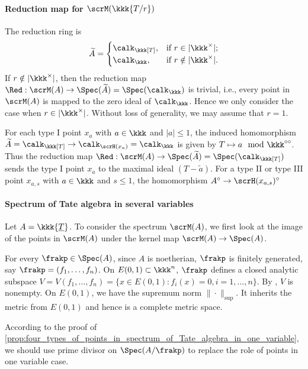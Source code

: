 \paragraph{Reduction map for \(\scrM(\kkk\{T/r\})\)}
The reduction ring is
\[ \widetilde{A} = \begin{cases}
		\calk_\kkk[T], & \text{if } r \in |\kkk^\times|;    \\
		\calk_\kkk,    & \text{if } r \notin |\kkk^\times|.
	\end{cases} \]
If \(r \notin |\kkk^\times|\), then the reduction map \(\Red: \scrM(A) \to \Spec(\widetilde{A}) = \Spec(\calk_\kkk)\) is trivial, i.e., every point in \(\scrM(A)\) is mapped to the zero ideal of \(\calk_\kkk\).
Hence we only consider the case when \(r \in |\kkk^\times|\).
Without loss of generality, we may assume that \(r = 1\).

For each type I point \(x_a\) with \(a \in \kkk\) and \(|a| \leq 1\), the induced homomorphism \(\widetilde{A} = \calk_\kkk[T] \to \calk_{\scrH(x_a)} = \calk_\kkk\) is given by \(T \mapsto a \mod \kkk^{\circ \circ}\).
Thus the reduction map \(\Red: \scrM(A) \to \Spec(\widetilde{A}) = \Spec(\calk_\kkk[T])\) sends the type I point \(x_a\) to the maximal ideal \((T - \tilde{a})\).
For a type II or type III point \(x_{a,s}\) with \(a \in \kkk\) and \(s \leq 1\), the homomorphism \(A^\circ \to \scrH(x_{a,s})^\circ\)




\paragraph{Spectrum of Tate algebra in several variables}
Let \(A = \kkk\{\underline{T}\}\).
To consider the spectrum \(\scrM(A)\),
we first look at the image of the points in \(\scrM(A)\) under the kernel map \(\scrM(A) \to \Spec(A)\).

For every \(\frakp \in \Spec(A)\), since \(A\) is noetherian, \(\frakp\) is finitely generated, say \(\frakp = (f_1, \ldots, f_n)\).
On \(E(0,1) \subset \kkk^n\), \(\frakp\) defines a closed analytic subspace \(V = V(f_1, \ldots, f_n) = \{x \in E(0,1) : f_i(x) = 0, i=1,\ldots,n\}\).
By , \(V\) is nonempty.
On \(E(0,1)\), we have the supremum norm \(\|\cdot\|_{\sup}\).
It inherits the metric from \(E(0,1)\) and hence is a complete metric space.

According to the proof of \cref{prop:four_types_of_points_in_spectrum_of_Tate_algebra_in_one_variable},
we should use prime divisor on \(\Spec(A/\frakp)\) to replace the role of points in one variable case.

